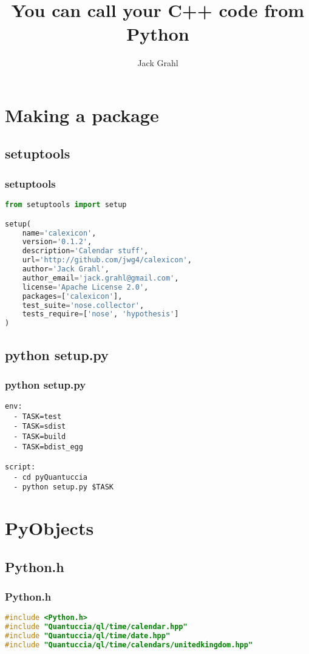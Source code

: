\documentclass{beamer}
\title{You can call your C++ code from Python}
\author{Jack Grahl}
\institute{PrismFP Analytics}
\begin{document}
	\frame{\titlepage}

	\section{Making a package}

	\subsection{setuptools}
	\begin{frame}[fragile]
		\frametitle{setuptools}
		\begin{lstlisting}[language=Python]
from setuptools import setup

setup(
    name='calexicon',
    version='0.1.2',
    description='Calendar stuff',
    url='http://github.com/jwg4/calexicon',
    author='Jack Grahl',
    author_email='jack.grahl@gmail.com',
    license='Apache License 2.0',
    packages=['calexicon'],
    test_suite='nose.collector',
    tests_require=['nose', 'hypothesis']
)
		\end{lstlisting}
	\end{frame}

	\subsection{python setup.py}
	\begin{frame}[fragile]
		\frametitle{python setup.py}
		\begin{lstlisting}
env:
  - TASK=test
  - TASK=sdist
  - TASK=build
  - TASK=bdist_egg

script:
  - cd pyQuantuccia
  - python setup.py $TASK
		\end{lstlisting}
	\end{frame}

	\section{PyObjects}

	\subsection{Python.h}
	\begin{frame}[fragile]
		\frametitle{Python.h}
		\begin{lstlisting}[language=C++]
#include <Python.h>
#include "Quantuccia/ql/time/calendar.hpp"
#include "Quantuccia/ql/time/date.hpp"
#include "Quantuccia/ql/time/calendars/unitedkingdom.hpp"
		\end{lstlisting}
	\end{frame}
\end{document}
